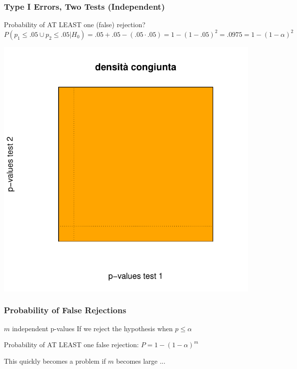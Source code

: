 \documentclass[xcolor={pdftex,dvipsnames,table}]{beamer}
\newcommand{\bb}[1]{\begin{block}{#1}}
\newcommand{\eb}{\end{block}}
\begin{document}
\begin{frame}
\frametitle{Type I Errors, Two Tests (Independent)}

Probability of AT LEAST one (false) rejection?\\
$P(p_1\leq .05 \cup p_2\leq .05 | H_0)= .05+.05-(.05\cdot .05)=1-(1-.05)^2=.0975=1-(1-\alpha)^2$

\includegraphics[scale=.5]{plaatjes/bivaH0indep}
\end{frame}

\begin{frame}
\frametitle{Probability of False Rejections}

\bb{$m$ independent p-values}
If we reject the hypothesis when $p\leq \alpha$
\eb
\bb{Probability of AT LEAST one false rejection:}
$P = 1- (1-\alpha)^m$
\eb

\pause
\bigskip
This quickly becomes a problem if $m$ becomes large ...

\end{frame}
\end{document}

